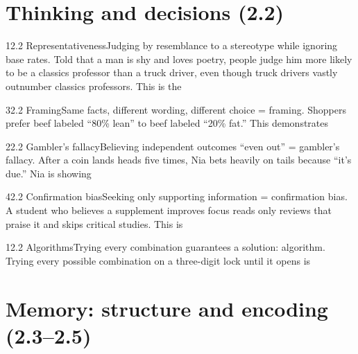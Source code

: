 \documentclass[11pt]{article}
\begin{document}
\section{Thinking and decisions (2.2)}

\begin{q}{1}{2.2 Representativeness}{Judging by resemblance to a stereotype while ignoring base rates.}
Told that a man is shy and loves poetry, people judge him more likely to be a classics professor than a truck driver, even though truck drivers vastly outnumber classics professors. This is the
\end{q}

\begin{q}{3}{2.2 Framing}{Same facts, different wording, different choice = framing.}
Shoppers prefer beef labeled ``80\% lean'' to beef labeled ``20\% fat.'' This demonstrates
\end{q}

\begin{q}{2}{2.2 Gambler's fallacy}{Believing independent outcomes ``even out'' = gambler's fallacy.}
After a coin lands heads five times, Nia bets heavily on tails because ``it's due.'' Nia is showing
\end{q}

\begin{q}{4}{2.2 Confirmation bias}{Seeking only supporting information = confirmation bias.}
A student who believes a supplement improves focus reads only reviews that praise it and skips critical studies. This is
\end{q}

\begin{q}{1}{2.2 Algorithms}{Trying every combination guarantees a solution: algorithm.}
Trying every possible combination on a three-digit lock until it opens is
\end{q}

\section{Memory: structure and encoding (2.3--2.5)}
\end{document}
